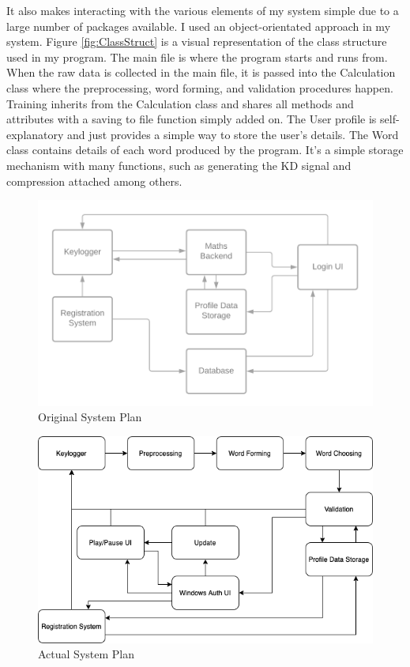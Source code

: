 \documentclass[10pt,a4paper]{report}
\begin{document}
It also makes interacting with the various elements of my system simple due to a large number of packages available. I used an object-orientated approach in my system. Figure \ref{fig:ClassStruct} is a visual representation of the class structure used in my program. The main file is where the program starts and runs from. When the raw data is collected in the main file, it is passed into the Calculation class where the preprocessing, word forming, and validation procedures happen. Training inherits from the Calculation class and shares all methods and attributes with a saving to file function simply added on. The User profile is self-explanatory and just provides a simple way to store the user's details. The Word class contains details of each word produced by the program. It's a simple storage mechanism with many functions, such as generating the KD signal and compression attached among others.

\begin{figure}
	\includegraphics[scale=0.7]{OldPlan}
	\caption{Original System Plan}
	\label{fig:OldPlan}
\end{figure}

\begin{figure}
	\includegraphics[scale=0.55]{SystemPlan}
	\caption{Actual System Plan}
	\label{fig:NewPlan}
\end{figure}
\end{document}
